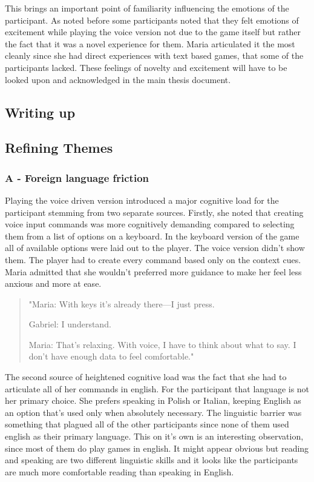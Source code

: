 This brings an important point of familiarity influencing the emotions of the participant. As noted before some participants noted that they felt emotions of excitement while playing the voice version not due to the game itself but rather the fact that it was a novel experience for them. Maria articulated it the most cleanly since she had direct experiences with text based games, that some of the participants lacked. 
These feelings of novelty and excitement will have to be looked upon and acknowledged in the main thesis document.







\subsection{Writing up}

\subsection{Refining Themes}

\subsubsection{A - Foreign language friction}

Playing the voice driven version introduced a major cognitive load for the participant stemming from two separate sources. 
Firstly, she noted that creating voice input commands was more cognitively demanding compared to selecting them from a list of options on a keyboard. In the keyboard version of the game all of available options were laid out to the player. The voice version didn't show them. The player had to create every command based only on the context cues. Maria admitted that she wouldn't preferred more guidance to make her feel less anxious and more at ease. 

\begin{quote}
    "Maria: With keys it’s already there—I just press.

    Gabriel: I understand.

    Maria: That’s relaxing.
    With voice, I have to think about what to say.
    I don’t have enough data to feel comfortable."
\end{quote}


The second source of heightened cognitive load was the fact that she had to articulate all of her commands in english. For the participant that language is not her primary choice. She prefers speaking in Polish or Italian, keeping English as an option that's used only when absolutely necessary. The linguistic barrier was something that plagued all of the other participants since none of them used english as their primary language. This on it's own is an interesting observation, since most of them do play games in english. It might appear obvious but reading and speaking are two different linguistic skills and it looks like the participants are much more comfortable reading than speaking in English.


